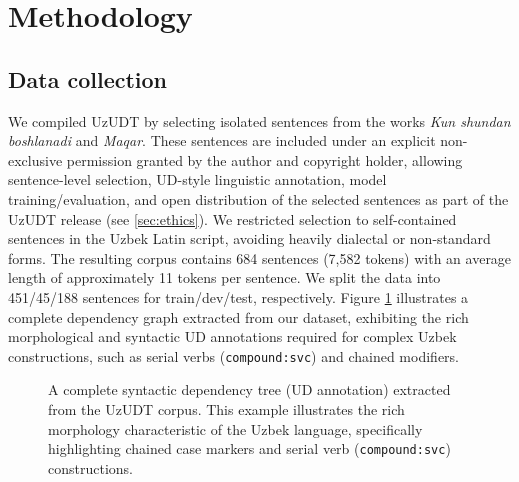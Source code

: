 \documentclass[10pt, a4paper]{article}
\begin{document}
\section{Methodology}
\label{sec:methodology}
\subsection{Data collection}
\label{sec:data_collection}
We compiled UzUDT by selecting isolated sentences from the works \textit{Kun shundan boshlanadi} and \textit{Maqar}.
These sentences are included under an explicit non-exclusive permission granted by the author and copyright holder,
allowing sentence-level selection, UD-style linguistic \cite{de-marneffe-etal-2021-universal} annotation, model training/evaluation, and open distribution
of the selected sentences as part of the UzUDT release (see \ref{sec:ethics}). We restricted selection to self-contained sentences in the Uzbek Latin script, avoiding heavily dialectal or non-standard forms. The resulting corpus contains 684 sentences (7,582 tokens) with an average length of approximately 11 tokens per sentence. We split the data into 451/45/188 sentences for train/dev/test, respectively. Figure \ref{fig:main_dependency_tree} illustrates a complete dependency graph extracted from our dataset, exhibiting the rich morphological and syntactic UD annotations required for complex Uzbek constructions, such as serial verbs (\texttt{compound:svc}) and chained modifiers.
\begin{figure}[htbp]
\centering
{}
\caption{A complete syntactic dependency tree (UD annotation) extracted from the UzUDT corpus. This example illustrates the rich morphology characteristic of the Uzbek language, specifically highlighting chained case markers and serial verb (\texttt{compound:svc}) constructions.}
\label{fig:main_dependency_tree}
\end{figure}
\end{document}
